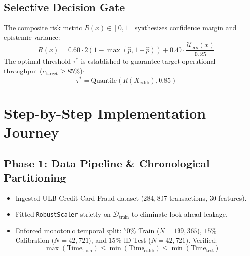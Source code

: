\documentclass[10pt,a4paper,twocolumn]{article}
\begin{document}
\subsection{Selective Decision Gate}
The composite risk metric $R(x) \in [0, 1]$ synthesizes confidence margin and epistemic variance:
\begin{equation}
  R(x) = 0.60 \cdot 2(1 - \max(\hat{p}, 1-\hat{p})) + 0.40 \cdot \frac{\mathcal{U}_{\text{ens}}(x)}{0.25}
\end{equation}
The optimal threshold $\tau^*$ is established to guarantee target operational throughput ($c_{\text{target}} \ge 85\%$):
\begin{equation}
  \tau^* = \text{Quantile}(R(X_{\text{calib}}), 0.85)
\end{equation}

\section{Step-by-Step Implementation Journey}

\subsection{Phase 1: Data Pipeline \& Chronological Partitioning}
\begin{itemize}
  \item Ingested ULB Credit Card Fraud dataset ($284,807$ transactions, $30$ features).
  \item Fitted \texttt{RobustScaler} strictly on $\mathcal{D}_{\text{train}}$ to eliminate look-ahead leakage.
  \item Enforced monotonic temporal split: $70\%$ Train ($N=199,365$), $15\%$ Calibration ($N=42,721$), and $15\%$ ID Test ($N=42,721$). Verified:
  \begin{equation}
    \max(\text{Time}_{\text{train}}) \le \min(\text{Time}_{\text{calib}}) \le \min(\text{Time}_{\text{test}})
  \end{equation}
\end{itemize}
\end{document}
